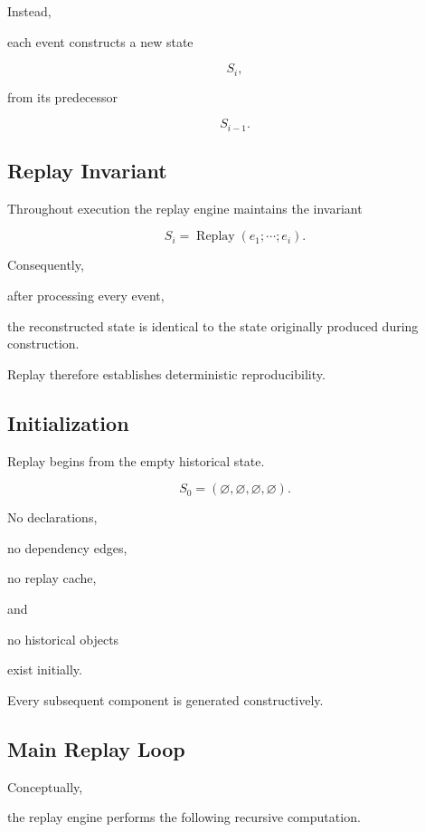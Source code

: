 \documentclass[12pt,oneside]{article}
\theoremstyle{definition}
\theoremstyle{remark}
\DeclareMathOperator{\Replay}{Replay}
\begin{document}
Instead,

each event constructs a new state

\[
S_i,
\]

from its predecessor

\[
S_{i-1}.
\]


\subsection{Replay Invariant}

Throughout execution the replay engine maintains the invariant

\[
S_i
=
\Replay(e_1;\cdots;e_i).
\]

Consequently,

after processing every event,

the reconstructed state is identical to the state originally produced during
construction.

Replay therefore establishes deterministic reproducibility.


\subsection{Initialization}

Replay begins from the empty historical state.

\[
S_0
=
(
\varnothing,
\varnothing,
\varnothing,
\varnothing
).
\]

No declarations,

no dependency edges,

no replay cache,

and

no historical objects

exist initially.

Every subsequent component is generated constructively.


\subsection{Main Replay Loop}

Conceptually,

the replay engine performs the following recursive computation.
\end{document}
